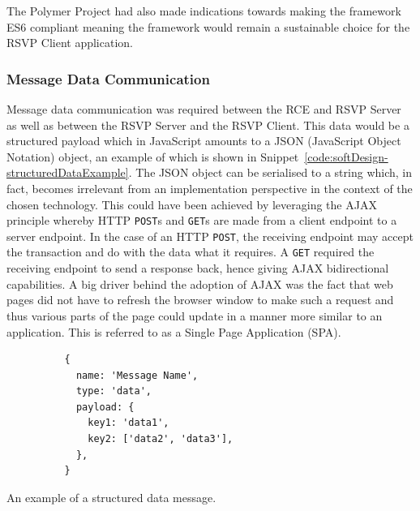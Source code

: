      The Polymer Project had also made indications towards making the framework ES6 compliant meaning the framework would remain a sustainable choice for the RSVP Client application.
      
    \subsubsection{Message Data Communication}
      Message data communication was required between the RCE and RSVP Server as well as between the RSVP Server and the RSVP Client. This data would be a structured payload which in JavaScript amounts to a JSON (JavaScript Object Notation) object, an example of which is shown in Snippet~\ref{code:softDesign-structuredDataExample}. The JSON object can be serialised to a string which, in fact, becomes irrelevant from an implementation perspective in the context of the chosen technology. This could have been achieved by leveraging the AJAX principle whereby HTTP \texttt{POST}s and \texttt{GET}s are made from a client endpoint to a server endpoint. In the case of an HTTP \texttt{POST}, the receiving endpoint may accept the transaction and do with the data what it requires. A \texttt{GET} required the receiving endpoint to send a response back, hence giving AJAX bidirectional capabilities. A big driver behind the adoption of AJAX was the fact that web pages did not have to refresh the browser window to make such a request and thus various parts of the page could update in a manner more similar to an application. This is referred to as a Single Page Application (SPA).
      
      \begin{code}
        \begin{verbatim}
          {
            name: 'Message Name',
            type: 'data',
            payload: {
              key1: 'data1',
              key2: ['data2', 'data3'],
            },
          }
        \end{verbatim}
        \caption{An example of a structured data message.}
        \label{code:softDesign-structuredDataExample}
      \end{code}
      

